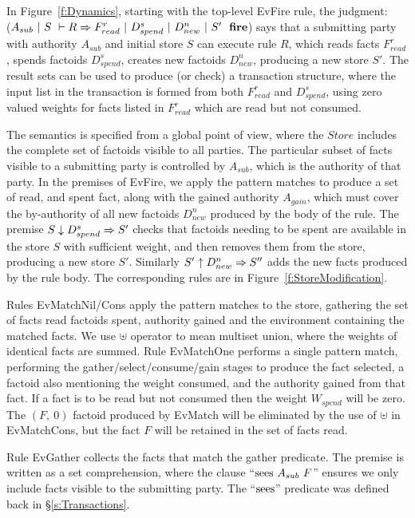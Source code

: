 In Figure~\ref{f:Dynamics}, starting with the top-level EvFire rule, the judgment: \\
($A_{sub}~|~S~\vdash R \Rightarrow F^r_{read}~|~D^s_{spend}~|~D^n_{new}~|~S'~~\textbf{fire}$) says that a submitting party with authority $A_{sub}$ and initial store $S$ can execute rule $R$, which reads facts $F^r_{read}$, spends factoids $D^s_{spend}$, creates new factoids $D^n_{new}$, producing a new store $S'$. The result sets can be used to produce (or check) a transaction structure, where the input list in the transaction is formed from both $F^r_{read}$ and $D^s_{spend}$, using zero valued weights for facts listed in $F^r_{read}$ which are read but not consumed.

The semantics is specified from a global point of view, where the $Store$ includes the complete set of factoids visible to all parties. The particular subset of facts visible to a submitting party is controlled by $A_{sub}$, which is the authority of that party. In the premises of EvFire, we apply the pattern matches to produce a set of read, and spent fact, along with the gained authority $A_{gain}$, which must cover the by-authority of all new factoids $D^n_{new}$ produced by the body of the rule. The premise $S \downarrow D^s_{spend} \Rightarrow S'$ checks that factoids needing to be spent are available in the store $S$ with sufficient weight, and then removes them from the store, producing a new store $S'$. Similarly $S' \uparrow D^n_{new} \Rightarrow S''$ adds the new facts produced by the rule body. The corresponding rules are in Figure~\ref{f:StoreModification}.

Rules EvMatchNil/Cons apply the pattern matches to the store, gathering the set of facts read factoids spent, authority gained and the environment containing the matched facts. We use $\uplus$ operator to mean multiset union, where the weights of identical facts are summed. Rule EvMatchOne performs a single pattern match, performing the gather/select/consume/gain stages to produce the fact selected, a factoid also mentioning the weight consumed, and the authority gained from that fact. If a fact is to be read but not consumed then the weight $W_{spend}$ will be zero. The $(F,~ 0)$ factoid produced by EvMatch will be eliminated by the use of $\uplus$ in EvMatchCons, but the fact $F$ will be retained in the set of facts read.

Rule EvGather collects the facts that match the gather predicate. The premise is written as a set comprehension, where the clause ``$\textrm{sees}~ A_{sub}~ F$'' ensures we only include facts visible to the submitting party. The ``$\textrm{sees}$'' predicate was defined back in \S\ref{s:Transactions}.

